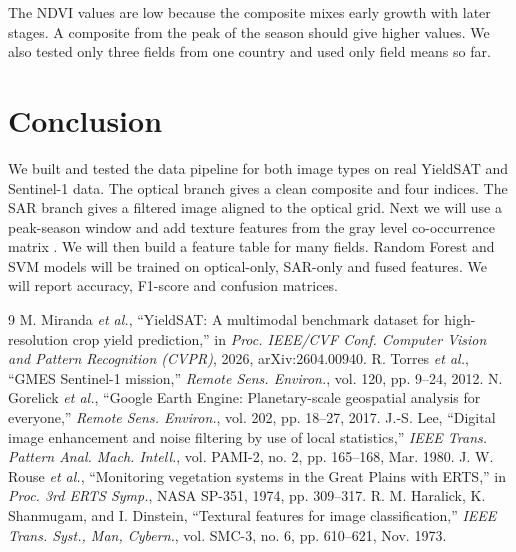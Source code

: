 \documentclass[conference]{IEEEtran}
\begin{document}
The NDVI values are low because the composite mixes early growth with later stages. A composite from the peak of the season should give higher values. We also tested only three fields from one country and used only field means so far.

\section{Conclusion}
We built and tested the data pipeline for both image types on real YieldSAT and Sentinel-1 data. The optical branch gives a clean composite and four indices. The SAR branch gives a filtered image aligned to the optical grid. Next we will use a peak-season window and add texture features from the gray level co-occurrence matrix \cite{haralick}. We will then build a feature table for many fields. Random Forest and SVM models will be trained on optical-only, SAR-only and fused features. We will report accuracy, F1-score and confusion matrices.

\begin{thebibliography}{9}
 M. Miranda \textit{et al.}, ``YieldSAT: A multimodal benchmark dataset for high-resolution crop yield prediction,'' in \textit{Proc. IEEE/CVF Conf. Computer Vision and Pattern Recognition (CVPR)}, 2026, arXiv:2604.00940.
 R. Torres \textit{et al.}, ``GMES Sentinel-1 mission,'' \textit{Remote Sens. Environ.}, vol. 120, pp. 9--24, 2012.
 N. Gorelick \textit{et al.}, ``Google Earth Engine: Planetary-scale geospatial analysis for everyone,'' \textit{Remote Sens. Environ.}, vol. 202, pp. 18--27, 2017.
 J.-S. Lee, ``Digital image enhancement and noise filtering by use of local statistics,'' \textit{IEEE Trans. Pattern Anal. Mach. Intell.}, vol. PAMI-2, no. 2, pp. 165--168, Mar. 1980.
 J. W. Rouse \textit{et al.}, ``Monitoring vegetation systems in the Great Plains with ERTS,'' in \textit{Proc. 3rd ERTS Symp.}, NASA SP-351, 1974, pp. 309--317.
 R. M. Haralick, K. Shanmugam, and I. Dinstein, ``Textural features for image classification,'' \textit{IEEE Trans. Syst., Man, Cybern.}, vol. SMC-3, no. 6, pp. 610--621, Nov. 1973.
\end{thebibliography}
\end{document}
